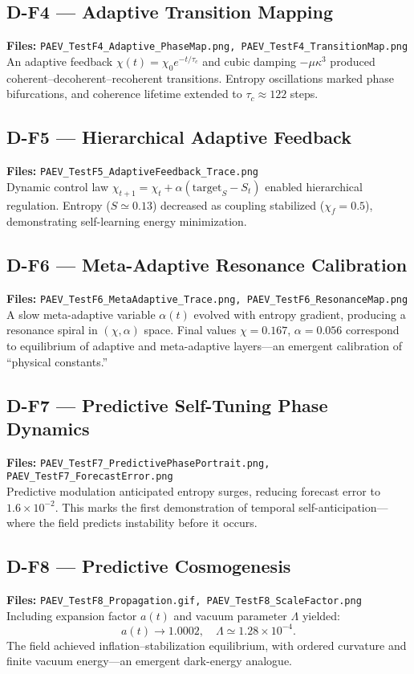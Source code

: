 \documentclass[12pt]{article}
\begin{document}
\subsection*{D-F4 — Adaptive Transition Mapping}
\textbf{Files:} \texttt{PAEV\_TestF4\_Adaptive\_PhaseMap.png, PAEV\_TestF4\_TransitionMap.png}\\
An adaptive feedback $\chi(t)=\chi_0 e^{-t/\tau_c}$ and cubic damping $-\mu\kappa^3$ produced coherent–decoherent–recoherent transitions.
Entropy oscillations marked phase bifurcations, and coherence lifetime extended to $\tau_c\approx122$ steps.

\subsection*{D-F5 — Hierarchical Adaptive Feedback}
\textbf{Files:} \texttt{PAEV\_TestF5\_AdaptiveFeedback\_Trace.png}\\
Dynamic control law $\chi_{t+1}=\chi_t+\alpha(\text{target}_S - S_t)$ enabled hierarchical regulation.
Entropy ($S\simeq0.13$) decreased as coupling stabilized ($\chi_f=0.5$), demonstrating self-learning energy minimization.

\subsection*{D-F6 — Meta-Adaptive Resonance Calibration}
\textbf{Files:} \texttt{PAEV\_TestF6\_MetaAdaptive\_Trace.png, PAEV\_TestF6\_ResonanceMap.png}\\
A slow meta-adaptive variable $\alpha(t)$ evolved with entropy gradient, producing a resonance spiral in $(\chi,\alpha)$ space.
Final values $\chi=0.167$, $\alpha=0.056$ correspond to equilibrium of adaptive and meta-adaptive layers—an emergent calibration of “physical constants.”

\subsection*{D-F7 — Predictive Self-Tuning Phase Dynamics}
\textbf{Files:} \texttt{PAEV\_TestF7\_PredictivePhasePortrait.png, PAEV\_TestF7\_ForecastError.png}\\
Predictive modulation anticipated entropy surges, reducing forecast error to $1.6\times10^{-2}$.
This marks the first demonstration of temporal self-anticipation—where the field predicts instability before it occurs.

\subsection*{D-F8 — Predictive Cosmogenesis}
\textbf{Files:} \texttt{PAEV\_TestF8\_Propagation.gif, PAEV\_TestF8\_ScaleFactor.png}\\
Including expansion factor $a(t)$ and vacuum parameter $\Lambda$ yielded:
\[
a(t)\to1.0002, \quad \Lambda\simeq1.28\times10^{-4}.
\]
The field achieved inflation–stabilization equilibrium, with ordered curvature and finite vacuum energy—an emergent dark-energy analogue.
\end{document}
